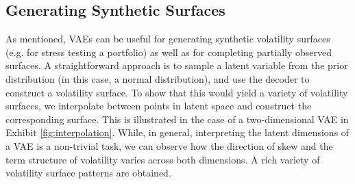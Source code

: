 \documentclass[12pt]{article}
\makeatletter
\newcommand{\specialcell}[2][c]{%
  \begin{tabular}[#1]{@{}c@{}}#2\end{tabular}}
\makeatother
\begin{document}


\subsection{Generating Synthetic Surfaces}

As mentioned, VAEs can be useful for generating synthetic volatility surfaces (e.g. for stress testing a portfolio) as well as for completing partially observed surfaces. A  straightforward approach is to sample a latent variable from the prior distribution (in this case, a normal distribution), and use the decoder to construct a volatility surface. To show that this would yield a variety of volatility surfaces, we interpolate between points in latent space and construct the corresponding surface.  This is illustrated in the case of a two-dimensional VAE in Exhibit \ref{fig:interpolation}. 
While, in general, interpreting the latent dimensions of a VAE is a non-trivial task, we can observe how the direction of skew and the term structure of volatility varies across both dimensions. A rich variety of volatility surface patterns are obtained. 
\end{document}
